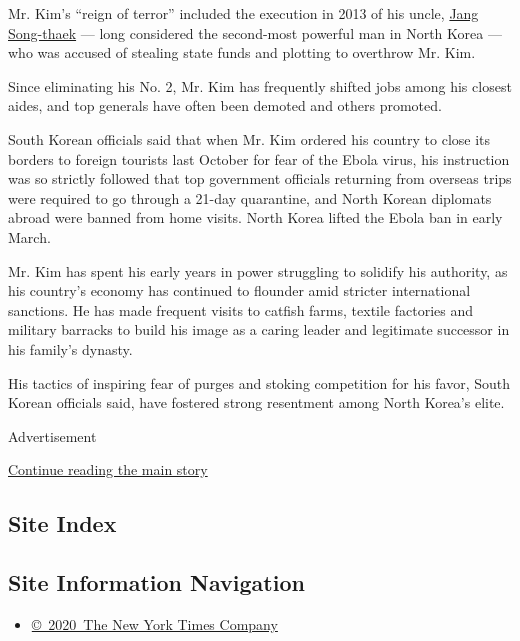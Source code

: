Mr. Kim's ``reign of terror'' included the execution in 2013 of his
uncle,
\href{http://www.nytimes3xbfgragh.onion/2013/12/24/world/asia/north-korea-purge.html}{Jang
Song-thaek} --- long considered the second-most powerful man in North
Korea --- who was accused of stealing state funds and plotting to
overthrow Mr. Kim.

Since eliminating his No. 2, Mr. Kim has frequently shifted jobs among
his closest aides, and top generals have often been demoted and others
promoted.

South Korean officials said that when Mr. Kim ordered his country to
close its borders to foreign tourists last October for fear of the Ebola
virus, his instruction was so strictly followed that top government
officials returning from overseas trips were required to go through a
21-day quarantine, and North Korean diplomats abroad were banned from
home visits. North Korea lifted the Ebola ban in early March.

Mr. Kim has spent his early years in power struggling to solidify his
authority, as his country's economy has continued to flounder amid
stricter international sanctions. He has made frequent visits to catfish
farms, textile factories and military barracks to build his image as a
caring leader and legitimate successor in his family's dynasty.

His tactics of inspiring fear of purges and stoking competition for his
favor, South Korean officials said, have fostered strong resentment
among North Korea's elite.

Advertisement

\protect\hyperlink{after-bottom}{Continue reading the main story}

\hypertarget{site-index}{%
\subsection{Site Index}\label{site-index}}

\hypertarget{site-information-navigation}{%
\subsection{Site Information
Navigation}\label{site-information-navigation}}

\begin{itemize}
\tightlist
\item
  \href{https://help.nytimes3xbfgragh.onion/hc/en-us/articles/115014792127-Copyright-notice}{©~2020~The
  New York Times Company}
\end{itemize}

